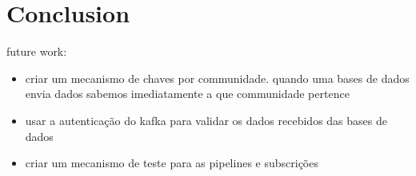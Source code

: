 \chapter{Conclusion}
\label{chapter:conclusion}

future work:
\begin{itemize}
    \item criar um mecanismo de chaves por communidade. quando uma bases de dados envia dados sabemos imediatamente a que communidade pertence
    \item usar a autenticação do kafka para validar os dados recebidos das bases de dados
    \item criar um mecanismo de teste para as pipelines e subscrições
\end{itemize}
